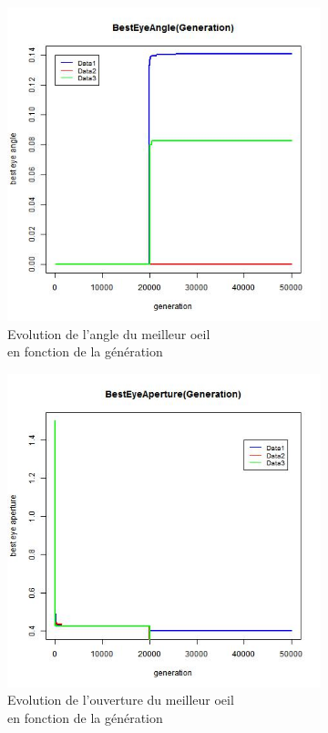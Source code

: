 \documentclass[a4paper,11pt]{article}
\begin{document}
\begin{figure}
\centering
\begin{subfigure}{.5\textwidth}
  \centering
\includegraphics[width=1\linewidth]{best_eye_angle.jpeg}
\caption{Evolution de l'angle du meilleur oeil \\en fonction de la génération}
\label{fig:best_1}
\end{subfigure}%
\begin{subfigure}{.5\textwidth}
  \centering
\includegraphics[width=1\linewidth]{best_eye_aperture.jpeg}
\caption{Evolution de l'ouverture du meilleur oeil \\en fonction de la génération}
\label{fig:best_2}
\end{subfigure}
\caption{}
\label{fig:test}
\end{figure}
\end{document}
